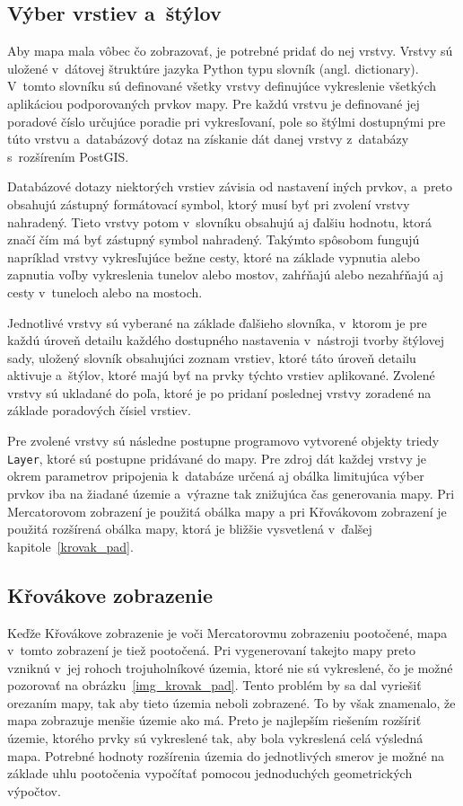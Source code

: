 \subsection*{Výber vrstiev a~štýlov}
Aby mapa mala vôbec čo zobrazovať, je potrebné pridať do nej vrstvy. Vrstvy sú uložené v~dátovej štruktúre jazyka Python typu slovník (angl. dictionary). V~tomto slovníku sú definované všetky vrstvy definujúce vykreslenie všetkých aplikáciou podporovaných prvkov mapy. Pre každú vrstvu je definované jej poradové číslo určujúce poradie pri vykresľovaní, pole so štýlmi dostupnými pre túto vrstvu a~databázový dotaz na získanie dát danej vrstvy z~databázy s~rozšírením PostGIS.

Databázové dotazy niektorých vrstiev závisia od nastavení iných prvkov, a~preto obsahujú zástupný formátovací symbol, ktorý musí byť pri zvolení vrstvy nahradený. Tieto vrstvy potom v~slovníku obsahujú aj ďalšiu hodnotu, ktorá značí čím má byť zástupný symbol nahradený. Takýmto spôsobom fungujú napríklad vrstvy vykresľujúce bežne cesty, ktoré na základe vypnutia alebo zapnutia voľby vykreslenia tunelov alebo mostov, zahŕňajú alebo nezahŕňajú aj cesty v~tuneloch alebo na mostoch.

Jednotlivé vrstvy sú vyberané na základe ďalšieho slovníka, v~ktorom je pre každú úroveň detailu každého dostupného nastavenia v~nástroji tvorby štýlovej sady, uložený slovník obsahujúci zoznam vrstiev, ktoré táto úroveň detailu aktivuje a~štýlov, ktoré majú byť na prvky týchto vrstiev aplikované. Zvolené vrstvy sú ukladané do poľa, ktoré je po pridaní poslednej vrstvy zoradené na základe poradových čísiel vrstiev. 

Pre zvolené vrstvy sú následne postupne programovo vytvorené objekty triedy {\tt Layer}, ktoré sú postupne pridávané do mapy. Pre zdroj dát každej vrstvy je okrem parametrov pripojenia k~databáze určená aj obálka limitujúca výber prvkov iba na žiadané územie a~výrazne tak znižujúca čas generovania mapy. Pri Mercatorovom zobrazení je použitá obálka mapy a pri Křovákovom zobrazení je použitá rozšírená obálka mapy, ktorá je bližšie vysvetlená v~ďalšej kapitole~\ref{krovak_pad}.

\subsection*{Křovákove zobrazenie}
\label{krovak_pad}
Keďže Křovákove zobrazenie je voči Mercatorovmu zobrazeniu pootočené, mapa v~tomto zobrazení je tiež pootočená. Pri vygenerovaní takejto mapy preto vzniknú v~jej rohoch trojuholníkové územia, ktoré nie sú vykreslené, čo je možné pozorovať na obrázku~\ref{img_krovak_pad}. Tento problém by sa dal vyriešiť orezaním mapy, tak aby tieto územia neboli zobrazené. To by však znamenalo, že mapa zobrazuje menšie územie ako má. Preto je najlepším riešením rozšíriť územie, ktorého prvky sú vykreslené tak, aby bola vykreslená celá výsledná mapa. Potrebné hodnoty rozšírenia územia do jednotlivých smerov je možné na základe uhlu pootočenia vypočítať pomocou jednoduchých geometrických výpočtov.

